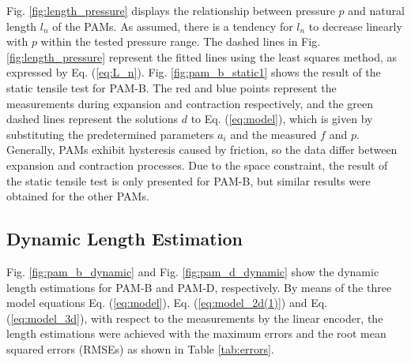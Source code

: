 Fig. \ref{fig:length_pressure} displays the relationship between pressure $p$ and natural length $l_n$ of the PAMs. As assumed, there is a tendency for $l_n$ to decrease linearly with $p$ within the tested pressure range. The dashed lines in Fig. \ref{fig:length_pressure} represent the fitted lines using the least squares method, as expressed by Eq. (\ref{eq:L_n}).
Fig. \ref{fig:pam_b_static1} shows the result of the static tensile test for PAM-B. The red and blue points represent the measurements during expansion and contraction respectively, and the green dashed lines represent the solutions $d$ to Eq. (\ref{eq:model}), which is given by substituting the predetermined parameters $a_i$ and the measured $f$ and $p$.
Generally, PAMs exhibit hysteresis caused by friction, so the data differ between expansion and contraction processes. Due to the space constraint, the result of the static tensile test is only presented for PAM-B, but similar results were obtained for the other PAMs.

\subsection{Dynamic Length Estimation} 
Fig. \ref{fig:pam_b_dynamic} and Fig. \ref{fig:pam_d_dynamic} show the dynamic length estimations for PAM-B and PAM-D, respectively.
By means of the three model equations Eq. (\ref{eq:model}), Eq. (\ref{eq:model_2d(1)}) and Eq. (\ref{eq:model_3d}), with respect to the measurements by the linear encoder, the length estimations were achieved with the maximum errors and the root mean squared errors (RMSEs) as shown in Table \ref{tab:errors}.%
   
